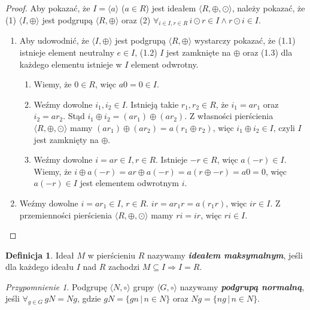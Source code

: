 \documentclass[declaration,shortabstract]{iithesis}
\theoremstyle{definition}
\newtheorem{definition}{Definicja}
\theoremstyle{remark} \newtheorem{observation}{Obserwacja}
\theoremstyle{plain} \newtheorem{theorem}{Twierdzenie}
\theoremstyle{plain} \newtheorem{lemma}{Lemat}
\theoremstyle{remark} \newtheorem*{remark*}{Uwaga}
\theoremstyle{reminder} \newtheorem*{reminder*}{Przypomnienie}
\begin{document}
\begin{proof}
	Aby pokazać, że $I = \langle a \rangle$ ($a \in R$) jest ideałem $\langle R, \oplus, \odot \rangle$, należy pokazać, że (1) $\langle I, \oplus \rangle$ jest podgrupą $\langle R, \oplus \rangle$ oraz (2) $\forall_{i \in I, r \in R} \, i \odot r \in I \wedge r \odot i \in I $.
	\begin{enumerate}[label={(\arabic*)}, leftmargin=.4in]
		\item Aby udowodnić, że $\langle I, \oplus \rangle$ jest podgrupą $\langle R, \oplus \rangle$ wystarczy pokazać, że (1.1) istnieje element neutralny $e \in I$, (1.2) $I$ jest zamknięte na $\oplus$ oraz (1.3) dla każdego elementu istnieje w $I$ element odwrotny.
		      \begin{enumerate}[label=(1.\arabic*)]
		      	\item Wiemy, że $0 \in R$, więc $a0=0 \in I$.
		      	\item Weźmy dowolne $i_1, i_2 \in I$. Istnieją takie $r_1, r_2 \in R$, że $i_1 = ar_1$ oraz $i_2 = ar_2$. Stąd $i_1 \oplus i_2 = (ar_1) \oplus (ar_2)$. Z własności pierścienia $\langle R, \oplus, \odot \rangle$ mamy $(ar_1) \oplus (ar_2) = a(r_1 \oplus r_2)$, więc $i_1 \oplus i_2 \in I$, czyli $I$ jest zamknięty na $\oplus$.
		      	\item Weźmy dowolne $i = ar \in I, r \in R$. Istnieje $-r \in R$, więc $a(-r) \in I$. Wiemy, że $i \oplus a(-r) = ar \oplus a(-r) = a(r \oplus -r) = a0 = 0$, więc $a(-r) \in I$ jest elementem odwrotnym $i$.
		      \end{enumerate}
		\item Weźmy dowolne $i = ar_1 \in I, \, r \in R$. $ir = ar_1r = a(r_1r)$, więc $ir \in I$. Z przemienności pierścienia $\langle R, \oplus, \odot \rangle$ mamy $ri = ir$, więc $ri \in I$.
	\end{enumerate}
\end{proof}

\theoremstyle{definition}
\begin{definition}
	Ideał $M$ w pierścieniu $R$ nazywamy \textit{\textbf{ideałem maksymalnym}}, jeśli dla każdego ideału $I$ nad $R$ zachodzi $M \subseteq I \Rightarrow I = R$.
\end{definition}

\begin{reminder*}
	Podgrupę $\langle N, \circ \rangle $ grupy $\langle G, \circ \rangle$ nazywamy \textit{\textbf{podgrupą normalną}}, jeśli $\forall_{g \in G} \, gN = Ng$, gdzie $gN = \{gn \, | \, n \in N\}$ oraz $Ng = \{ng \, | \, n \in N\}$.
\end{reminder*}
\end{document}
